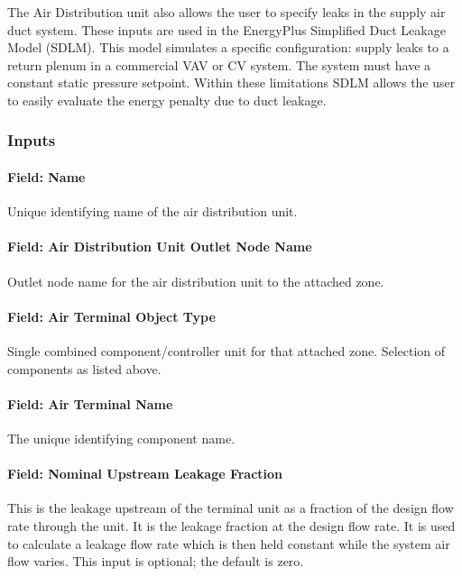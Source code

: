 The Air Distribution unit also allows the user to specify leaks in the supply air duct system. These inputs are used in the EnergyPlus Simplified Duct Leakage Model (SDLM). This model simulates a specific configuration: supply leaks to a return plenum in a commercial VAV or CV system. The system must have a constant static pressure setpoint. Within these limitations SDLM allows the user to easily evaluate the energy penalty due to duct leakage.

\subsubsection{Inputs}\label{inputs-055}

\paragraph{Field: Name}\label{field-name-053}

Unique identifying name of the air distribution unit.

\paragraph{Field: Air Distribution Unit Outlet Node Name}\label{field-air-distribution-unit-outlet-node-name}

Outlet node name for the air distribution unit to the attached zone.

\paragraph{Field: Air Terminal Object Type}\label{field-air-terminal-object-type}

Single combined component/controller unit for that attached zone. Selection of components as listed above.

\paragraph{Field: Air Terminal Name}\label{field-air-terminal-name}

The unique identifying component name.

\paragraph{Field: Nominal Upstream Leakage Fraction}\label{field-nominal-upstream-leakage-fraction}

This is the leakage upstream of the terminal unit as a fraction of the design flow rate through the unit. It is the leakage fraction at the design flow rate. It is used to calculate a leakage flow rate which is then held constant while the system air flow varies. This input is optional; the default is zero.

